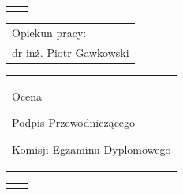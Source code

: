 \begin{titlepage}
{\begin{center}
	\vspace*{7\baselineskip}
	\hfill\mbox{}\par\vspace*{\baselineskip}\noindent
	\begin{tabular}[b]{@{}p{3cm}@{\ }l@{}}
	    {\large\hfill } & {\large }
	\end{tabular}
	\hfill
	\begin{tabular}[b]{@{}l@{}}
	Opiekun pracy: \\[\smallskipamount]
	{\large dr inż. Piotr Gawkowski}
	\end{tabular}\par
	\vspace*{4\baselineskip}
    \begin{tabular}{p{\textwidth}}
    \begin{flushleft}
	\begin{minipage}{7cm}
	Ocena \dotfill
	\par\vspace{1.6\baselineskip}
	\dotfill
	\par\noindent
	\centerline{\footnotesize Podpis Przewodniczącego} \par
	\centerline{\footnotesize Komisji Egzaminu Dyplomowego}\par
	\end{minipage}
    \end{flushleft}
    \end{tabular}
    \end{center}}

    \newpage\thispagestyle{empty}
    \begin{tabular}{p{4cm} p{12cm}}
    \begin{minipage}{5cm}
    

\end{minipage}
\end{tabular}
\end{titlepage}
